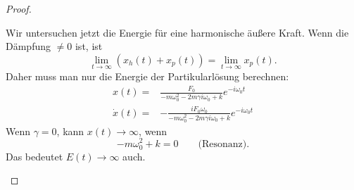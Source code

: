 \begin{proof}
\begin{enumerate}
Wir untersuchen jetzt die Energie f\"{u}r eine harmonische äußere Kraft. Wenn die Dämpfung $\neq 0$ ist, ist
\[
\lim_{t \to \infty} \left( x_h(t)+x_p(t) \right) =\lim_{t \to \infty} x_p(t)
.\] 
Daher muss man nur die Energie der Partikularlösung berechnen:
\begin{align*}
	x(t)=& \frac{F_0}{-m\omega_0^2-2m\gamma i\omega_0+k}e^{-i\omega_0t}\\
	\dot{x}(t)=&-\frac{iF_0\omega_0}{-m\omega_0^2-2m\gamma i\omega_0+k}e^{-i\omega_0t}
\end{align*}
Wenn $\gamma = 0$, kann $x(t)\to\infty$, wenn
\[
	-m\omega_0^2+k=0\qquad\text{(Resonanz)}
.\]
Das bedeutet $E(t)\to \infty$ auch.
\end{enumerate}
\end{proof}
